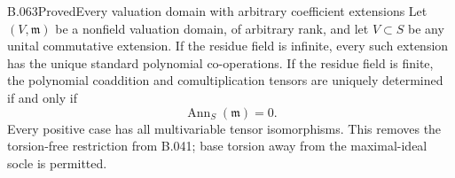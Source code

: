 \begin{saresult}{B.063}{Proved}{Every valuation domain with arbitrary coefficient extensions}
Let $(V,\mathfrak m)$ be a nonfield valuation domain,
of arbitrary rank, and let $V\subset S$ be any
unital commutative extension. If the residue field
is infinite, every such extension has the unique
standard polynomial co-operations. If the residue
field is finite, the polynomial coaddition and
comultiplication tensors are uniquely determined
if and only if
\[
                         \operatorname{Ann}_S(\mathfrak m)=0.
                                                               \tag{B63.1}
\]
Every positive case has all multivariable tensor
isomorphisms. This removes the torsion-free
restriction from B.041; base torsion away from
the maximal-ideal socle is permitted.
\end{saresult}
